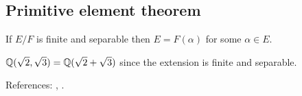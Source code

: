 \subsection{Primitive element theorem}
\begin{theorem}\label{thm:PET}
If $E/F$ is finite and separable then $E=F(\alpha)$ for some $\alpha\in E$.
\end{theorem}
\begin{example}
$\mathbb{Q}(\sqrt2,\sqrt3)=\mathbb{Q}(\sqrt2+\sqrt3)$ since the extension is finite and separable.
\end{example}
References: \cite[\S14]{DF}, \cite[Ch.~VI]{Artin}.

